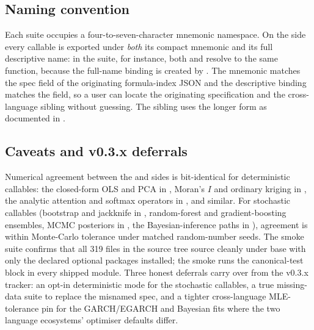 \documentclass[article,shortnames,nojss]{jss}
\begin{document}
\subsection{Naming convention}\label{sec:textbook-naming}

Each suite occupies a four-to-seven-character mnemonic
namespace.  On the  side every callable is exported
under \emph{both} its compact mnemonic and its full descriptive
name: in the  suite, for instance, both
 and  resolve to
the same function, because the full-name binding is created by
.  The mnemonic matches
the spec  field of the originating formula-index JSON
and the descriptive binding matches the  field,
so a user can locate the originating specification and the
cross-language sibling without guessing.  The  sibling uses the longer form
 as documented in
\citet{Ruhela2026MoriePy}.

\subsection{Caveats and v0.3.x deferrals}\label{sec:textbook-caveats}

Numerical agreement between the  and 
sides is bit-identical for deterministic callables: the
closed-form OLS and PCA in , Moran's $I$
and ordinary kriging in , the analytic
attention and softmax operators in , and similar.  For stochastic callables
(bootstrap and jackknife in , random-forest
and gradient-boosting ensembles, MCMC posteriors in
, the Bayesian-inference paths in
), agreement is within Monte-Carlo
tolerance under matched random-number seeds.  The
 smoke suite confirms that all 319 
files in the source tree source cleanly under base 
with only the declared  optional packages
installed; the  smoke runs the 
canonical-test block in every shipped module.  Three honest
deferrals carry over from the v0.3.x tracker: an opt-in
deterministic mode for the stochastic callables, a true
missing-data suite to replace the misnamed 
spec, and a tighter cross-language MLE-tolerance pin for the
GARCH/EGARCH and Bayesian fits where the two language
ecosystems' optimiser defaults differ.
\end{document}
